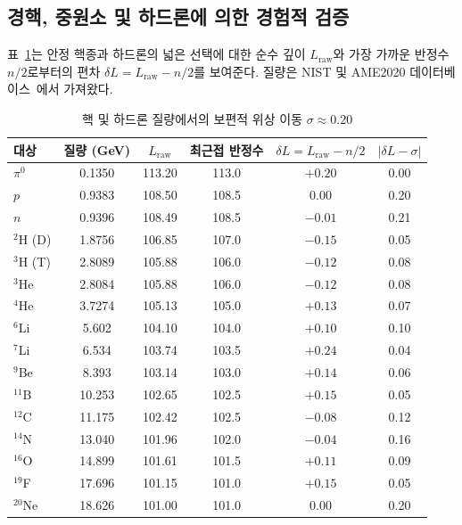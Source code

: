\documentclass[12pt,a4paper]{article}
\begin{document}
	\subsection{경핵, 중원소 및 하드론에 의한 경험적 검증}
	
	표~\ref{tab:nuclear_sigma}는 안정 핵종과 하드론의 넓은 선택에 대한 순수 깊이 \(L_{\mathrm{raw}}\)와 가장 가까운 반정수 \(n/2\)로부터의 편차 \(\delta L = L_{\mathrm{raw}} - n/2\)를 보여준다. 질량은 NIST 및 AME2020 데이터베이스~\cite{AME2020}에서 가져왔다.
	
	\begin{table}[htbp]
		\centering
		\caption{핵 및 하드론 질량에서의 보편적 위상 이동 \(\sigma \approx 0.20\)}
		\label{tab:nuclear_sigma}
		\small
		\begin{tabular}{l c c c c c}
			\toprule
			대상 & 질량 (GeV) & \(L_{\mathrm{raw}}\) & 최근접 반정수 & \(\delta L = L_{\mathrm{raw}} - n/2\) & \(|\delta L - \sigma|\) \\
			\midrule
			\(\pi^0\) & 0.1350 & 113.20 & 113.0 & \(+0.20\) & 0.00 \\
			\(p\)     & 0.9383 & 108.50 & 108.5 & \(0.00\)  & 0.20 \\
			\(n\)     & 0.9396 & 108.49 & 108.5 & \(-0.01\) & 0.21 \\
			\(^2\)H (D) & 1.8756 & 106.85 & 107.0 & \(-0.15\) & 0.05 \\
			\(^3\)H (T) & 2.8089 & 105.88 & 106.0 & \(-0.12\) & 0.08 \\
			\(^3\)He & 2.8084 & 105.88 & 106.0 & \(-0.12\) & 0.08 \\
			\(^4\)He & 3.7274 & 105.13 & 105.0 & \(+0.13\) & 0.07 \\
			\(^6\)Li & 5.602  & 104.10 & 104.0 & \(+0.10\) & 0.10 \\
			\(^7\)Li & 6.534  & 103.74 & 103.5 & \(+0.24\) & 0.04 \\
			\(^9\)Be & 8.393  & 103.14 & 103.0 & \(+0.14\) & 0.06 \\
			\(^{11}\)B & 10.253 & 102.65 & 102.5 & \(+0.15\) & 0.05 \\
			\(^{12}\)C & 11.175 & 102.42 & 102.5 & \(-0.08\) & 0.12 \\
			\(^{14}\)N & 13.040 & 101.96 & 102.0 & \(-0.04\) & 0.16 \\
			\(^{16}\)O & 14.899 & 101.61 & 101.5 & \(+0.11\) & 0.09 \\
			\(^{19}\)F & 17.696 & 101.15 & 101.0 & \(+0.15\) & 0.05 \\
			\(^{20}\)Ne & 18.626 & 101.00 & 101.0 & \(0.00\)  & 0.20 \\

\end{tabular}
\end{table}
\end{document}
